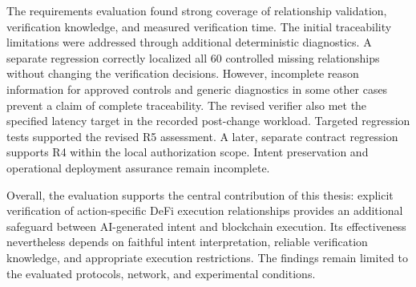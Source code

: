 The requirements evaluation found strong coverage of relationship validation,
verification knowledge, and measured verification time. 
The initial traceability limitations were addressed through additional
deterministic diagnostics. A separate regression correctly localized
all 60 controlled missing relationships without changing the
verification decisions. However, incomplete reason information for
approved controls and generic diagnostics in some other cases prevent
a claim of complete traceability. The revised verifier also met the
specified latency target in the recorded post-change workload. Targeted
regression tests supported the revised R5 assessment. A later, separate
contract regression supports R4 within the local authorization scope.
Intent preservation and operational deployment assurance remain incomplete.

Overall, the evaluation supports the central contribution of this thesis:
explicit verification of action-specific DeFi execution relationships provides
an additional safeguard between AI-generated intent and blockchain execution.
Its effectiveness nevertheless depends on faithful intent interpretation,
reliable verification knowledge, and appropriate execution restrictions.
The findings remain limited to the evaluated protocols, network, and
experimental conditions.

